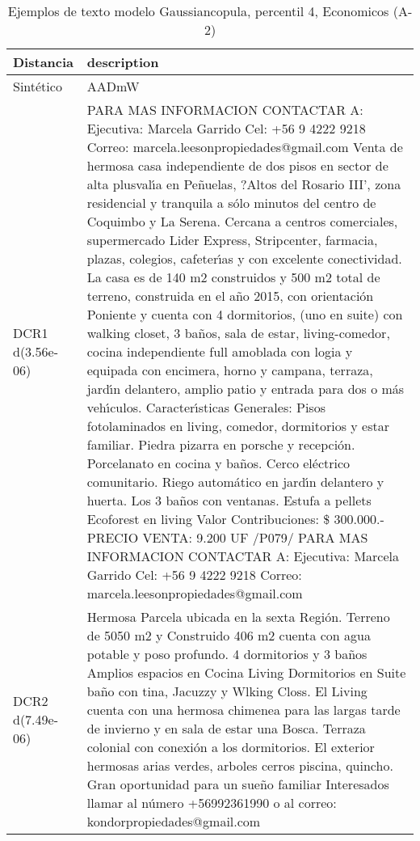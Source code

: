 \begin{table}[H]
\centering
\fontsize{10}{14}\selectfont
\caption{Ejemplos de texto modelo Gaussiancopula, percentil 4, Economicos (A-2)}
\label{table-example-economicos-a-2-gaussiancopula-4p-text}
\begin{tabular}{|l|m{35em}|}
\hline
\rowcolor[gray]{0.8}
Distancia & description \\
\hline Sintético & AADmW \\
\hline DCR1 d(3.56e-06) & PARA MAS INFORMACION CONTACTAR A:  Ejecutiva: Marcela Garrido  Cel: +56 9 4222 9218 Correo: marcela.leesonpropiedades@gmail.com   Venta de hermosa casa independiente de dos pisos en sector de alta plusval{\'\i}a en Pe\~nuelas, ?Altos del Rosario III', zona residencial y tranquila a s\'olo minutos del centro de Coquimbo y La Serena. Cercana a centros comerciales, supermercado Lider Express, Stripcenter, farmacia, plazas, colegios, cafeter{\'\i}as y con excelente conectividad.  La casa es de 140 m2 construidos y 500 m2 total de terreno, construida en el a\~no 2015, con orientaci\'on Poniente y cuenta con 4 dormitorios, (uno en suite) con walking closet, 3 ba\~nos, sala de estar, living-comedor, cocina independiente full amoblada con logia y equipada con encimera, horno y campana, terraza, jard{\'\i}n delantero, amplio patio y entrada para dos o m\'as veh{\'\i}culos.  Caracter{\'\i}sticas Generales:  Pisos fotolaminados en living, comedor, dormitorios y estar familiar. Piedra pizarra en porsche y recepci\'on. Porcelanato en cocina y ba\~nos. Cerco el\'ectrico comunitario. Riego autom\'atico en jard{\'\i}n delantero y huerta. Los 3 ba\~nos con ventanas. Estufa a pellets Ecoforest en living Valor Contribuciones: \$ 300.000.-  PRECIO VENTA: 9.200 UF  /P079/  PARA MAS INFORMACION CONTACTAR A:  Ejecutiva: Marcela Garrido  Cel: +56 9 4222 9218 Correo: marcela.leesonpropiedades@gmail.com \\
\hline DCR2 d(7.49e-06) & Hermosa Parcela  ubicada en la sexta Regi\'on. Terreno de 5050 m2 y Construido 406 m2 cuenta con agua potable y poso profundo.
 4 dormitorios y 3 ba\~nos Amplios espacios en Cocina Living Dormitorios en Suite  ba\~no con tina, Jacuzzy  y Wlking Closs. El Living cuenta con una hermosa chimenea  para las largas tarde de invierno y en sala de estar una Bosca. Terraza colonial con conexi\'on a los dormitorios.  El exterior hermosas arias verdes, arboles cerros piscina, quincho.  Gran oportunidad para un sue\~no familiar  
Interesados llamar al n\'umero +56992361990 o al correo: kondorpropiedades@gmail.com \\
\hline
\end{tabular}
\end{table}

